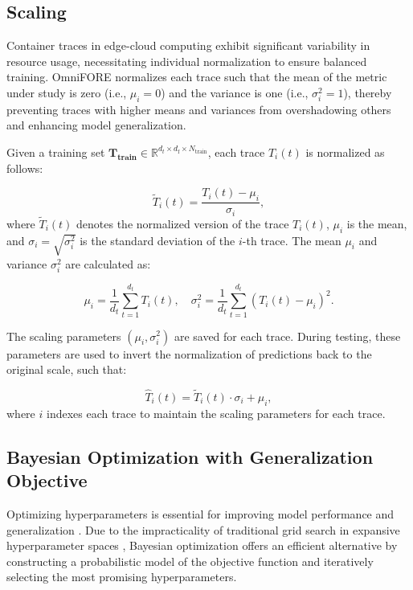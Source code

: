 \subsection{Scaling}

Container traces in edge-cloud computing exhibit significant variability in resource usage, necessitating individual normalization to ensure balanced training. OmniFORE normalizes each trace such that the mean of the metric under study is zero (i.e., $\mu_i=0$) and the variance is one (i.e., $\sigma_i^2=1$), thereby preventing traces with higher means and variances from overshadowing others and enhancing model generalization.

Given a training set $\mathbf{T_{\text{train}}} \in \mathbb{R}^{d_t \times d_{\text{f}} \times N_{\text{train}}}$, each trace $T_i(t)$ is normalized as follows:

\begin{equation}
\tilde{T}_i(t) = \frac{T_i(t) - \mu_i}{\sigma_i},  
\end{equation}
where $\tilde{T}_i(t)$ denotes the normalized version of the trace $T_i(t)$, \(\mu_i\) is the mean, and \(\sigma_i = \sqrt{\sigma_i^2}\) is the standard deviation of the \(i\)-th trace. The mean \(\mu_i\) and variance \(\sigma_i^2\) are calculated as:

\begin{equation}
\mu_i = \frac{1}{d_t} \sum_{t=1}^{d_t} T_i(t), \quad \sigma_i^2 = \frac{1}{d_t} \sum_{t=1}^{d_t} (T_i(t) - \mu_i)^2.
\end{equation}

The scaling parameters $(\mu_i, \sigma_i^2)$ are saved for each trace. During testing, these parameters are used to invert the normalization of predictions back to the original scale, such that:

\begin{equation}
\hat{T}_i(t) = \tilde{T}_i(t) \cdot \sigma_i + \mu_i,
\end{equation}
where $i$ indexes each trace to maintain the scaling parameters for each trace.

\subsection{Bayesian Optimization with Generalization Objective}
\label{sec: Bayesian Optimization with Generalization Objective}

Optimizing hyperparameters is essential for improving model performance and generalization \cite{hyperparamsdatasets}. Due to the impracticality of traditional grid search in expansive hyperparameter spaces \cite{gridsearchvsbayesian}, Bayesian optimization \cite{frazier2018tutorial} offers an efficient alternative by constructing a probabilistic model of the objective function and iteratively selecting the most promising hyperparameters.

